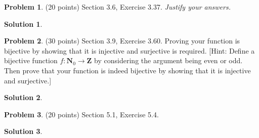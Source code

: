 \documentclass{article}
\theoremstyle{definition}
\newtheorem{problem}{Problem}
\newtheorem*{solution}{Solution}
\newcommand{\N}{\mathbf{N}}
\newcommand{\Z}{\mathbf{Z}}
\begin{document}
\newpage
\begin{problem} (20 points) Section 3.6, Exercise 3.37. \textit{Justify your answers.}
\end{problem}
\begin{solution} 
\end{solution}

\newpage
\begin{problem} (30 points) Section 3.9, Exercise 3.60. Proving your function 
is bijective by showing that it is injective and surjective is required.
[Hint: Define a bijective function $f\colon \N_0\rightarrow \Z$ by
considering the argument being even or odd. Then prove that your 
function is indeed bijective by showing that it is injective and surjective.]
\end{problem}
\begin{solution} 
\end{solution}

\newpage
\begin{problem} (20 points) Section 5.1, Exercise 5.4.
\end{problem}
\begin{solution} 
\end{solution}
\end{document}
